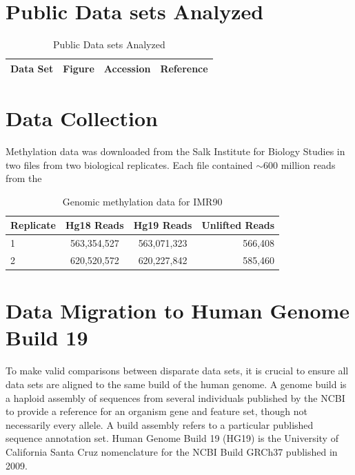 \documentclass[phd,tocprelim]{cornell}
\begin{document}
\begin{figure}

\end{figure}



%
%

\appendix
\appendixpage%
\addappheadtotoc%

\chapter{Public Data sets Analyzed}

\begin{table}
  \centering
  \begin{tabular}{lccr}
    \hline
    Data Set & Figure & Accession & Reference \\ \hline
    \hline
  \end{tabular}
  \caption{Public Data sets Analyzed}
\end{table}


\chapter{Data Collection}

Methylation data was downloaded from the Salk Institute for Biology Studies in
two files from two biological replicates.  Each file contained $\sim600$ million
reads from the

\begin{table}
  \centering
  \begin{tabular}{lccr}
    \hline
    Replicate & Hg18 Reads & Hg19 Reads & Unlifted Reads \\ \hline
    1 & 563,354,527 & 563,071,323 & 566,408 \\
    2 & 620,520,572 & 620,227,842 & 585,460 \\
    \hline
  \end{tabular}
  \caption{Genomic methylation data for IMR90}
\end{table}

\chapter{Data Migration to Human Genome Build 19}

To make valid comparisons between disparate data sets, it is crucial to ensure all data sets are aligned to the same
build of the human genome.  A genome build is a haploid assembly of sequences from several individuals published by
the NCBI to provide a reference for an organism gene and feature set, though not necessarily every allele.  A build assembly
refers to a particular published sequence annotation set.  Human Genome Build 19 (HG19) is the University of California Santa
Cruz nomenclature for the NCBI Build GRCh37 published in 2009\cite{NCBI2015}.
\end{document}
